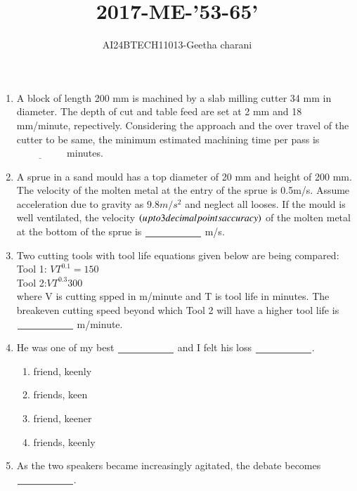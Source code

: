 \documentclass[journal,12pt,onecolumn]{IEEEtran}
\theoremstyle{remark}
\begin{document}

\vspace{3cm}

\title{2017-ME-'53-65'}
\author{AI24BTECH11013-Geetha charani}
\maketitle
\bigskip

\renewcommand{\thefigure}{\theenumi}
\renewcommand{\thetable}{\theenumi}
\begin{enumerate}
\item A block of length 200 mm is machined by a slab milling cutter 34 mm in diameter. The depth of cut and table feed are set at 2 mm and 18 mm/minute, repectively. Considering the approach and the over travel of the cutter to be same, the minimum estimated machining time per pass is $\underline{\hspace{2cm}}$ minutes.
\item A sprue in a sand mould has a top diameter of 20 mm and height of 200 mm. The velocity of the molten metal at the entry of the sprue is 0.5m/s. Assume acceleration due to gravity as $9.8 m/{s}^2$ and neglect all looses. If the mould is well ventilated, the velocity $\left(upto 3 decimal points accuracy\right)$ of the molten metal at the bottom of the sprue is $\underline{\hspace{2 cm}}$ m/s.
\item Two cutting tools with tool life equations given below are being compared:\\
Tool 1: $VT^{0.1} = 150$\\
Tool 2:$VT^{0.3} 300$\\
where V is cutting spped in m/minute and T is tool life in minutes. The breakeven cutting speed beyond which Tool 2 will have a higher tool life is $\underline{\hspace{2 cm}}$ m/minute.
\item He was one of my best $\underline{\hspace{2 cm}}$ and I felt his loss $\underline{\hspace{2 cm}}$.
\begin{enumerate}
    \item friend, keenly
    \item friends, keen 
    \item friend, keener 
    \item friends, keenly
\end{enumerate}
\item As the two speakers became increasingly agitated, the debate becomes $\underline{\hspace{2 cm}}$.

\end{enumerate}
\end{document}
